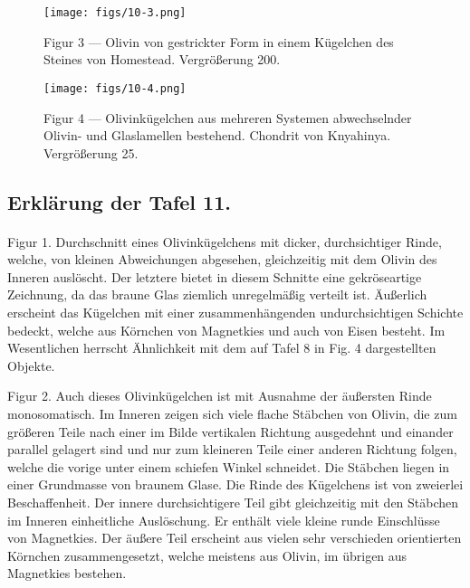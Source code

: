 \documentclass[a4paper, 12pt, oneside]{article}
\begin{document}
\vspace*{\fill}
\begin{figure}[H]
\centering
\texttt{[image: figs/10-3.png]}
\caption{\small Figur 3 --- Olivin von gestrickter Form in einem Kügelchen des Steines von Homestead. Vergrößerung 200.}
\end{figure}
\vspace*{\fill}
\clearpage

\vspace*{\fill}
\begin{figure}[H]
\centering
\texttt{[image: figs/10-4.png]}
\caption{\small Figur 4 --- Olivinkügelchen aus mehreren Systemen abwechselnder Olivin- und Glaslamellen bestehend. Chondrit von Knyahinya. Vergrößerung 25.}
\end{figure}
\vspace*{\fill}
\clearpage

\subsection{Erklärung der Tafel 11.}
\paragraph{}
Figur 1. Durchschnitt eines Olivinkügelchens mit dicker, durchsichtiger Rinde, welche, von kleinen Abweichungen abgesehen, gleichzeitig mit dem Olivin des Inneren auslöscht. Der letztere bietet in diesem Schnitte eine gekröseartige Zeichnung, da das braune Glas ziemlich unregelmäßig verteilt ist. Äußerlich erscheint das Kügelchen mit einer zusammenhängenden undurchsichtigen Schichte bedeckt, welche aus Körnchen von Magnetkies und auch von Eisen besteht. Im Wesentlichen herrscht Ähnlichkeit mit dem auf Tafel 8 in Fig. 4 dargestellten Objekte.

Figur 2. Auch dieses Olivinkügelchen ist mit Ausnahme der äußersten Rinde monosomatisch. Im Inneren zeigen sich viele flache Stäbchen von Olivin, die zum größeren Teile nach einer im Bilde vertikalen Richtung ausgedehnt und einander parallel gelagert sind und nur zum kleineren Teile einer anderen Richtung folgen, welche die vorige unter einem schiefen Winkel schneidet. Die Stäbchen liegen in einer Grundmasse von braunem Glase. Die Rinde des Kügelchens ist von zweierlei Beschaffenheit. Der innere durchsichtigere Teil gibt gleichzeitig mit den Stäbchen im Inneren einheitliche Auslöschung. Er enthält viele kleine runde Einschlüsse von Magnetkies. Der äußere Teil erscheint aus vielen sehr verschieden orientierten Körnchen zusammengesetzt, welche meistens aus Olivin, im übrigen aus Magnetkies bestehen.
\end{document}
